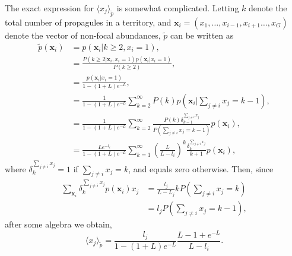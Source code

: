 \documentclass[11pt]{article}
\begin{document}
The exact expression for $\langle x_j \rangle_{\tilde{p}}$ is somewhat complicated. Letting $k$ denote the total number of propagules in a territory, and ${\mathbf x_i}=(x_1,\ldots,x_{i-1},x_{i+1}\ldots,x_G)$ denote the vector of non-focal abundances, $\tilde{p}$ can be written as
\begin{align}
\tilde{p}({\mathbf x_i})&=p({\mathbf x_i}|k\geq 2,x_i=1),\nonumber\\
&=\frac{P(k\geq 2|{\mathbf x_i},x_i=1) p({\mathbf x_i}|x_i=1)}{P(k\geq 2)},\nonumber\\
&=\frac{p({\mathbf x_i}|x_i=1)}{1-(1+L)e^{-L}},\nonumber\\
&=\frac{1}{1-(1+L)e^{-L}}\sum_{k=2}^{\infty} P(k) p({\mathbf x_i}|\sum_{j\neq i} x_j=k-1),\nonumber\\
&=\frac{1}{1-(1+L)e^{-L}}\sum_{k=2}^{\infty} \frac{P(k)\delta^{\sum_{j\neq i} x_j}_{k-1}}{P(\sum_{j\neq i} x_j=k-1)} p({\mathbf x_i}),\nonumber\\
&=\frac{Le^{-l_i}}{1-(1+L)e^{-L}}\sum_{k=1}^{\infty} \left(\frac{L}{L-l_i}\right)^k\frac{\delta^{\sum_{j\neq i} x_j}_k}{k+1} p({\mathbf x_i}),\label{eq:raremonster}
\end{align}
where $\delta^{\sum_{j\neq i} x_j}_k=1$ if $\sum_{j\neq i} x_j=k$, and equals zero otherwise. Then, since 
\begin{align}
\sum_{\mathbf x_i}\delta^{\sum_{j\neq i} x_j}_k p({\mathbf x_i})x_j&= \frac{l_j}{L-L_j}kP(\sum_{j\neq i} x_j=k)\nonumber\\
&=l_j P(\sum_{j\neq i} x_j=k-1),
\end{align}
after some algebra we obtain,
\begin{equation}
\langle x_j \rangle_{\tilde{p}}=\frac{l_j}{1-(1+L)e^{-L}}\frac{L-1+e^{-L}}{L-l_i}.\label{eq:meanxjrare}
\end{equation}
\end{document}
